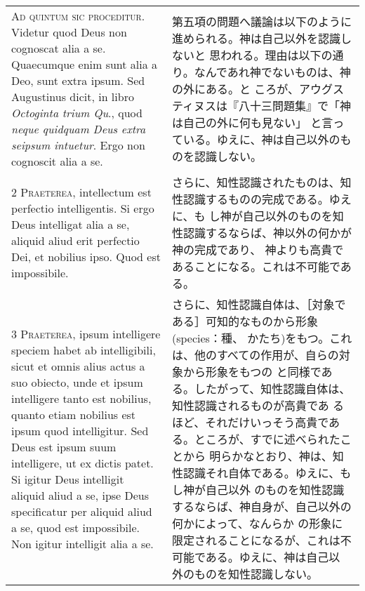 \documentclass[10pt]{jsarticle} %
\begin{document}
\begin{longtable}{p{21em}p{21em}}

{\huge A}{\scshape d quintum sic proceditur}. Videtur quod Deus non
cognoscat alia a se. Quaecumque enim sunt alia a Deo, sunt extra
ipsum. Sed Augustinus dicit, in libro {\itshape Octoginta trium Qu}.,
quod {\itshape neque quidquam Deus extra seipsum intuetur}. Ergo non
cognoscit alia a se.


&

第五項の問題へ議論は以下のように進められる。神は自己以外を認識しないと
思われる。理由は以下の通り。なんであれ神でないものは、神の外にある。と
ころが、アウグスティヌスは『八十三問題集』で「神は自己の外に何も見ない」
と言っている。ゆえに、神は自己以外のものを認識しない。

\\


{\scshape 2 Praeterea}, intellectum est perfectio intelligentis. Si
ergo Deus intelligat alia a se, aliquid aliud erit perfectio Dei, et
nobilius ipso. Quod est impossibile.

&

さらに、知性認識されたものは、知性認識するものの完成である。ゆえに、も
し神が自己以外のものを知性認識するならば、神以外の何かが神の完成であり、
神よりも高貴であることになる。これは不可能である。


\\


{\scshape 3 Praeterea}, ipsum intelligere speciem habet ab
intelligibili, sicut et omnis alius actus a suo obiecto, unde et ipsum
intelligere tanto est nobilius, quanto etiam nobilius est ipsum quod
intelligitur. Sed Deus est ipsum suum intelligere, ut ex dictis
patet. Si igitur Deus intelligit aliquid aliud a se, ipse Deus
specificatur per aliquid aliud a se, quod est impossibile. Non igitur
intelligit alia a se.


&

さらに、知性認識自体は、［対象である］可知的なものから形象(species：種、
かたち)をもつ。これは、他のすべての作用が、自らの対象から形象をもつの
と同様である。したがって、知性認識自体は、知性認識されるものが高貴であ
るほど、それだけいっそう高貴である。ところが、すでに述べられたことから
明らかなとおり、神は、知性認識それ自体である。ゆえに、もし神が自己以外
のものを知性認識するならば、神自身が、自己以外の何かによって、なんらか
の形象に限定されることになるが、これは不可能である。ゆえに、神は自己以
外のものを知性認識しない。


\\



\end{longtable}
\end{document}
